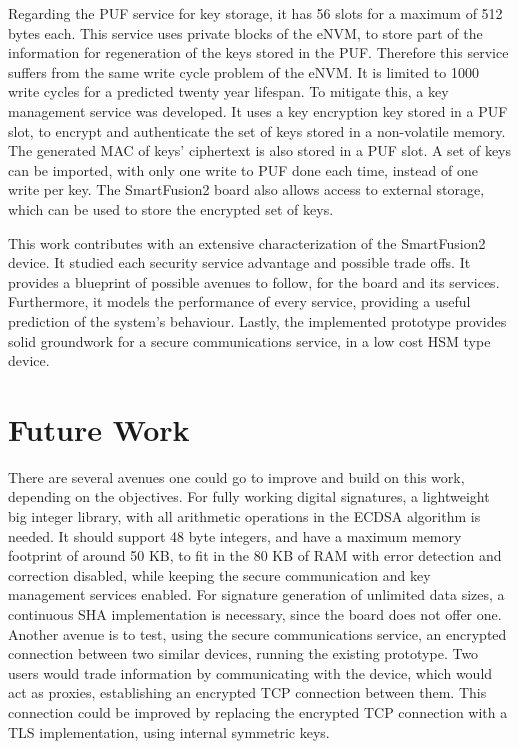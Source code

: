 Regarding the PUF service for key storage, it has 56 slots for a maximum of 512 bytes each. This service uses private blocks of the eNVM, to store part of the information for regeneration of the keys stored in the PUF. Therefore this service suffers from the same write cycle problem of the eNVM. It is limited to 1000 write cycles for a predicted twenty year lifespan. To mitigate this, a key management service was developed. It uses a key encryption key stored in a PUF slot, to encrypt and authenticate the set of keys stored in a non-volatile memory. The generated MAC of keys' ciphertext is also stored in a PUF slot. A set of keys can be imported, with only one write to PUF done each time, instead of one write per key. The SmartFusion2 board also allows access to external storage, which can be used to store the encrypted set of keys.

This work contributes with an extensive characterization of the SmartFusion2 device. It studied each security service advantage and possible trade offs. It provides a blueprint of possible avenues to follow, for the board and its services. Furthermore, it models the performance of every service, providing a useful prediction of the system's behaviour. Lastly, the implemented prototype provides solid groundwork for a secure communications service, in a low cost HSM type device.

\section{Future Work} \label{chap:conclusion:future-work}

There are several avenues one could go to improve and build on this work, depending on the objectives. For fully working digital signatures, a lightweight big integer library, with all arithmetic operations in the ECDSA algorithm is needed. It should support 48 byte integers, and have a maximum memory footprint of around 50 KB, to fit in the 80 KB of RAM with error detection and correction disabled, while keeping the secure communication and key management services enabled. For signature generation of unlimited data sizes, a continuous SHA implementation is necessary, since the board does not offer one.
Another avenue is to test, using the secure communications service, an encrypted connection between two similar devices, running the existing prototype. Two users would trade information by communicating with the device, which would act as proxies, establishing an encrypted TCP connection between them. This connection could be improved by replacing the encrypted TCP connection with a TLS implementation, using internal symmetric keys.
